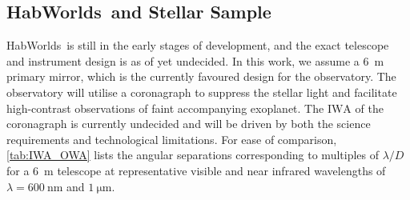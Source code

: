 \documentclass[
    usenatbib,
]{mnras}
\newcommand{\IWA}{\ensuremath{\mathrm{IWA}}}
\newcommand{\hwo}{HabWorlds}
\begin{document}
\subsection{\hwo\ and Stellar Sample}
\hwo\ is still in the early stages of development, and the exact telescope and instrument design is as of yet undecided. 
%
In this work, we assume a \SI{6}{\meter} primary mirror, which is the currently favoured design for the observatory.
%
The observatory will utilise a coronagraph to suppress the stellar light and facilitate high-contrast observations of faint accompanying exoplanet. 
%
The \IWA{} of the coronagraph is currently undecided and will be driven by both the science requirements and technological limitations. 
For ease of comparison, \cref{tab:IWA_OWA} lists the angular separations corresponding to multiples of $\lambda / D$ for a \SI{6}{\meter} telescope at representative visible and near infrared wavelengths of $\lambda = \SI{600}{\nano\meter}$ and $\SI{1}{\micro\meter}$.
 
\end{document}
